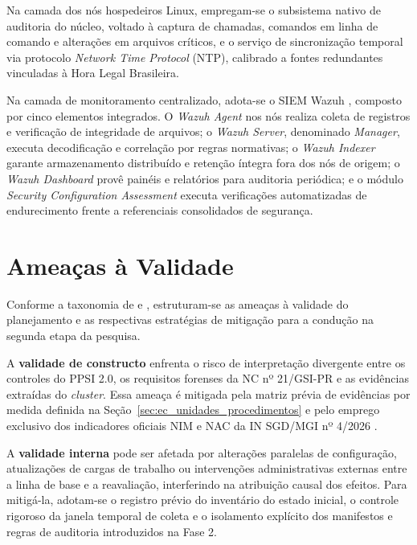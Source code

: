 Na camada dos nós hospedeiros Linux, empregam-se o subsistema nativo de auditoria do núcleo, voltado à captura de chamadas, comandos em linha de comando e alterações em arquivos críticos, e o serviço de sincronização temporal via protocolo \textit{Network Time Protocol} (NTP), calibrado a fontes redundantes vinculadas à Hora Legal Brasileira.

Na camada de monitoramento centralizado, adota-se o SIEM Wazuh \cite{wazuh2025}, composto por cinco elementos integrados. O \textit{Wazuh Agent} nos nós realiza coleta de registros e verificação de integridade de arquivos; o \textit{Wazuh Server}, denominado \textit{Manager}, executa decodificação e correlação por regras normativas; o \textit{Wazuh Indexer} garante armazenamento distribuído e retenção íntegra fora dos nós de origem; o \textit{Wazuh Dashboard} provê painéis e relatórios para auditoria periódica; e o módulo \textit{Security Configuration Assessment} executa verificações automatizadas de endurecimento frente a referenciais consolidados de segurança.



\section{Ameaças à Validade}
\label{sec:ec_ameacas_validade}

Conforme a taxonomia de  e , estruturam-se as ameaças à validade do planejamento e as respectivas estratégias de mitigação para a condução na segunda etapa da pesquisa.

A \textbf{validade de constructo} enfrenta o risco de interpretação divergente entre os controles do PPSI 2.0, os requisitos forenses da NC nº 21/GSI-PR e as evidências extraídas do \textit{cluster}. Essa ameaça é mitigada pela matriz prévia de evidências por medida definida na Seção~\ref{sec:ec_unidades_procedimentos} e pelo emprego exclusivo dos indicadores oficiais NIM e NAC da IN SGD/MGI nº 4/2026 \cite{in4_2026}.

A \textbf{validade interna} pode ser afetada por alterações paralelas de configuração, atualizações de cargas de trabalho ou intervenções administrativas externas entre a linha de base e a reavaliação, interferindo na atribuição causal dos efeitos. Para mitigá-la, adotam-se o registro prévio do inventário do estado inicial, o controle rigoroso da janela temporal de coleta e o isolamento explícito dos manifestos e regras de auditoria introduzidos na Fase 2.

